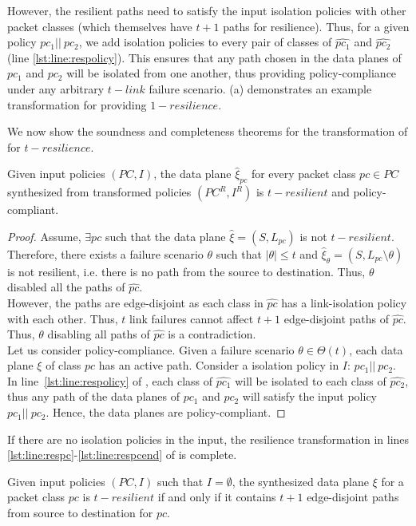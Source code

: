 However, the resilient paths need to satisfy the input isolation policies with other 
packet classes (which themselves have $t+1$ paths for resilience). Thus, for a 
given policy $pc_1 || ~pc_2$, we add isolation policies to every pair of 
classes of $\hat{pc_1}$ and $\hat{pc_2}$ (line \ref{lst:line:respolicy}). This ensures that any path 
chosen in the data planes of $pc_1$ and $pc_2$ will be isolated from one 
another, thus providing policy-compliance under any arbitrary $t-link$ failure
scenario. (a) demonstrates an example transformation for providing $1-resilience$. 

We now show the soundness and completeness theorems for the 
transformation of  for $t-resilience$. 
\begin{theorem}[Soundness]
Given input policies $(PC, I)$, 
the data plane $\hat{\xi}_{pc}$ for every packet class $pc \in PC$
 synthesized from
transformed policies $(PC^R, I^R)$  is $t-resilient$ 
	and policy-compliant. 
\end{theorem}
\iffull
\begin{proof}
		Assume, $\exists pc$ such that the data plane $\hat{\xi} = (S, L_{pc})$
		is not $t-resilient$. 
		Therefore, there exists a failure scenario $\theta$ such that $|\theta| \leq t$ 
		and $\hat{\xi}_\theta = (S, L_{pc} \setminus \theta)$ 
		is not resilient, i.e. there is no path from the source to destination. 
		Thus, $\theta$ disabled all the paths of $\hat{pc}$. \\
		However, the paths are
		edge-disjoint as each class in $\hat{pc}$ has a link-isolation policy with each 
		other. Thus, $t$ link failures cannot affect $t+1$ 
		edge-disjoint paths of $\hat{pc}$. Thus, $\theta$ disabling all paths of
		$\hat{pc}$ is a contradiction. \\
		Let us consider policy-compliance. Given a failure scenario $\theta \in \Theta(t)$, each data plane $\xi$ of class $pc$ has an active path. Consider a isolation policy in $I$: $pc_1 || \ pc_2$. In line~\ref{lst:line:respolicy} of , each class of $\hat{pc_1}$ will be isolated to
		each class of $\hat{pc_2}$, thus any path of the data planes of $pc_1$ and
		$pc_2$ will satisfy the input policy $pc_1 || \ pc_2$. Hence, the data planes 
		are policy-compliant. 
	\end{proof}
	\fi
\noindent If there are no isolation policies in the input, the resilience transformation in lines 
\ref{lst:line:respc}-\ref{lst:line:respcend} of  is complete.
\begin{theorem}[Completeness]
Given input policies $(PC,I)$ such that $I=\emptyset$,
the synthesized data plane $\xi$ for a packet class $pc$  
is $t-resilient$ if and only if it 
contains $t + 1$ edge-disjoint paths from source to destination
for $pc$.
\end{theorem}
